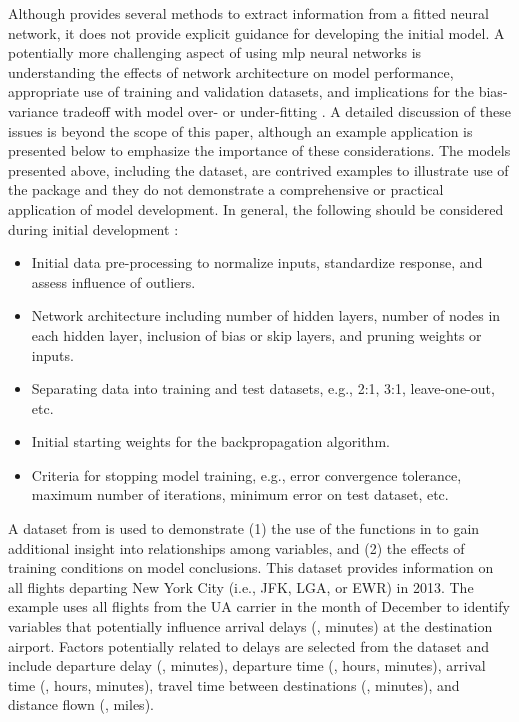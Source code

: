 \documentclass[article]{jss}
\begin{document}
Although  provides several methods to extract
information from a fitted neural network, it does not provide explicit
guidance for developing the initial model.  A potentially more
challenging aspect of using \ac{mlp} neural networks is understanding
the effects of network architecture on model performance, appropriate
use of training and validation datasets, and implications for the
bias-variance tradeoff with model over- or under-fitting
\citep{Maier00}.  A detailed discussion of these issues is beyond the
scope of this paper, although an example application is presented
below to emphasize the importance of these considerations.  The models
presented above, including the  dataset, are contrived
examples to illustrate use of the  package and
they do not demonstrate a comprehensive or practical application of
model development.  In general, the following should be considered
during initial development \citep{Ripley96, Lek00, Maier00}:
\begin{itemize}
\item Initial data pre-processing to normalize inputs, standardize response, and assess influence of outliers.
\item Network architecture including number of hidden layers, number of nodes in each hidden layer, inclusion of bias or skip layers, and pruning weights or inputs.
\item Separating data into training and test datasets, e.g., 2:1, 3:1, leave-one-out, etc.
\item Initial starting weights for the backpropagation algorithm.
\item Criteria for stopping model training, e.g., error convergence tolerance, maximum number of iterations, minimum error on test dataset, etc.
\end{itemize}

A dataset from  \citep{Wickham14b} is used to
demonstrate (1) the use of the functions in  to
gain additional insight into relationships among variables, and (2)
the effects of training conditions on model conclusions.
This dataset provides information on all flights departing New York
City (i.e., JFK, LGA, or EWR) in 2013.  The example uses all flights
from the UA carrier in the month of December to identify variables
that potentially influence arrival delays (, minutes)
at the destination airport.  Factors potentially related to delays
are selected from the dataset and include departure delay
(, minutes), departure time (, hours,
minutes), arrival time (, hours, minutes), travel time
between destinations (, minutes), and distance flown
(, miles).
\end{document}
